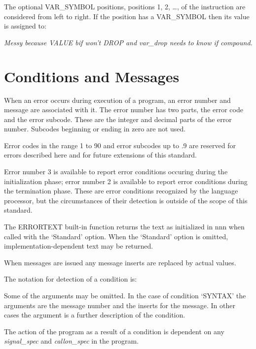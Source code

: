 The optional VAR\_SYMBOL positions, positions 1, 2, \ldots, of the
instruction are considered from left to right. If the position has a
VAR\_SYMBOL then its value is assigned to:



\emph{Messy because VALUE bif won't DROP and var\_drop needs to know if
compound.}

\section{Conditions and Messages}\label{conditions-and-messages}

When an error occurs during execution of a program, an error number and
message are associated with it. The error number has two parts, the
error code and the error subcode. These are the integer and decimal
parts of the error number. Subcodes beginning or ending in zero are not
used.

Error codes in the range 1 to 90 and error subcodes up to .9 are
reserved for errors described here and for future extensions of this
standard.

Error number 3 is available to report error conditions occuring during
the initialization phase; error number 2 is available to report error
conditions during the termination phase. These are error conditions
recognized by the language processor, but the circumstances of their
detection is outside of the scope of this standard.

The ERRORTEXT built-in function returns the text as initialized in nnn
when called with the `Standard' option. When the `Standard' option is
omitted, implementation-dependent text may be returned.

When messages are issued any message inserts are replaced by actual
values.

The notation for detection of a condition is:



Some of the arguments may be omitted. In the case of condition `SYNTAX'
the arguments are the message number and the inserts for the message. In
other cases the argument is a further description of the condition.

The action of the program as a result of a condition is dependent on any
\emph{signal\_spec} and \emph{callon\_spec} in the program.

